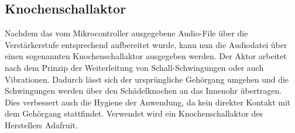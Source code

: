 \subsection{Knochenschallaktor} \label{sec:knochenschallaktor}

Nachdem das vom Mikrocontroller ausgegebene Audio-File über die Verstärkerstufe entsprechend aufbereitet wurde, kann nun die Audiodatei über einen sogenannten Knochenschallaktor ausgegeben werden.
Der Aktor arbeitet nach dem Prinzip der Weiterleitung von Schall-Schwingungen oder auch Vibrationen. Dadurch lässt sich der ursprüngliche Gehörgang umgehen und die Schwingungen werden über den Schädelknochen an das Innenohr übertragen. Dies verbessert auch die Hygiene der Anwendung, da kein direkter Kontakt mit dem Gehörgang stattfindet.\cite{Knochenschall}
Verwendet wird ein Knochenschallaktor des Herstellers Adafruit. 


